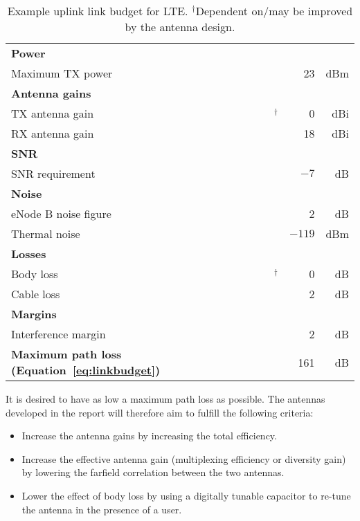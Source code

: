 \def\MARK{$^{\dagger}$\xspace}
\begin{table}[htbp]
    \centering
    \begin{tabular}{|l|c|r|r|}
        \hline
        \textbf{Power}         &                     &        &     \\
        Maximum TX power       & \cite{holma2011lte} & 23     & dBm \\
        \hline
        \textbf{Antenna gains} &                     &        &     \\
        TX antenna gain        & \MARK               & 0      & dBi \\
        RX antenna gain        & \cite{holma2011lte} & 18     & dBi \\
        \hline
        \textbf{SNR}           &                     &        &     \\
        SNR requirement        & \cite{holma2011lte} & $-7$   & dB  \\
        \hline
        \textbf{Noise}         &                     &        &     \\
        eNode B noise figure   & \cite{holma2011lte} & 2      & dB  \\
        Thermal noise          & \cite{holma2011lte} & $-119$ & dBm \\
        \hline
        \textbf{Losses}        &                     &        &     \\
        Body loss              & \MARK               & 0      & dB  \\
        Cable loss             & \cite{holma2011lte} & 2      & dB  \\
        \hline
        \textbf{Margins}       &                     &        &     \\
        Interference margin    & \cite{holma2011lte} & 2      & dB  \\
        \hline
        \textbf{Maximum path loss (Equation~\ref{eq:linkbudget})} & & 161    & dB  \\
        \hline
    \end{tabular}
    \caption{Example uplink link budget for LTE. \MARK{}Dependent on/may be improved by the antenna design.}
    \label{tab:linkbudget}
\end{table}

It is desired to have as low a maximum path loss as possible. The antennas developed in the report will therefore aim to fulfill the following criteria:
\begin{itemize}
    \item Increase the antenna gains by increasing the total efficiency.
    \item Increase the effective antenna gain (multiplexing efficiency or diversity gain) by lowering the farfield correlation between the two antennas.
    \item Lower the effect of body loss by using a digitally tunable capacitor to re-tune the antenna in the presence of a user.
\end{itemize}
